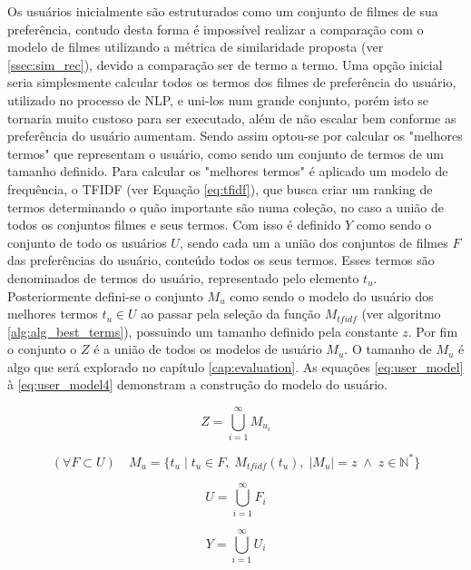 Os usuários inicialmente são estruturados como um conjunto de filmes de sua preferência, contudo desta forma é impossível realizar a comparação com o modelo de filmes utilizando a métrica de similaridade proposta (ver \ref{ssec:sim_rec}), devido a comparação ser de termo a termo. Uma opção inicial seria simplesmente calcular todos os termos dos filmes de preferência do usuário, utilizado no processo de \ac{NLP}, e uni-los num grande conjunto, porém isto se tornaria muito custoso para ser executado, além de não escalar bem conforme as preferência do usuário aumentam. Sendo assim optou-se por calcular os "melhores termos" que representam o usuário, como sendo um conjunto de termos de um tamanho definido. Para calcular os "melhores termos" é aplicado um modelo de frequência, o \ac{TFIDF} (ver Equação \ref{eq:tfidf}), que busca criar um ranking de termos determinando o quão importante são numa coleção, no caso a união de todos os conjuntos filmes e seus termos. Com isso é definido $Y$ como sendo o conjunto de todo os usuários $U$, sendo cada um a união dos conjuntos de filmes $F$ das preferências do usuário, conteúdo todos os seus termos. Esses termos são denominados de termos do usuário, representado pelo elemento $t_u$. Posteriormente defini-se o conjunto $M_u$ como sendo o modelo do usuário dos melhores termos $t_u \in U$ ao passar pela seleção da função $M_{tfidf}$ (ver algoritmo \ref{alg:alg_best_terms}), possuindo um tamanho definido pela constante $z$. Por fim o conjunto o $Z$ é a união de todos os modelos de usuário $M_u$. O tamanho de $M_u$ é algo que será explorado no capítulo \ref{cap:evaluation}. As equações \ref{eq:user_model} à \ref{eq:user_model4} demonstram a construção do modelo do usuário.

\begin{equation}
	Z = \bigcup\limits_{i=1}^{\infty} M_{u_i}
\label{eq:user_model}
\end{equation}

\begin{equation}
	(\forall F \subset U) \quad M_u = \{t_u \;| \; t_u \in F, \; M_{tfidf}(t_u), \; |M_u| = z \; \land \; z \in \mathbb{N}^*\}
\end{equation}

\begin{equation}
	U = \bigcup\limits_{i=1}^{\infty} F_i
\label{eq:user_model4}
\end{equation}

\begin{equation}
	Y = \bigcup\limits_{i=1}^{\infty} U_i
\label{eq:user_model5}
\end{equation}

